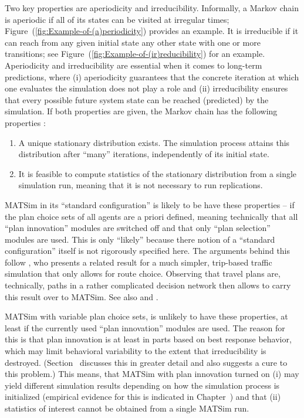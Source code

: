 Two key properties are aperiodicity and irreducibility. Informally,
a Markov chain is aperiodic if all of its states can be visited at
irregular times; Figure~(\ref{fig:Example-of-(a)periodicity}) provides
an example. It is irreducible if it can reach from any given initial
state any other state with one or more transitions; see Figure~(\ref{fig:Example-of-(ir)reducibility})
for an example. Aperiodicity and irreducibility are essential when
it comes to long-term predictions, where (i) aperiodicity guarantees
that the concrete iteration at which one evaluates the simulation
does not play a role and (ii) irreducibility ensures that every possible
future system state can be reached (predicted) by the simulation.
If both properties are given, the Markov chain has the following properties
\citep{ross-2006}:
\begin{enumerate}
\item A unique stationary distribution exists. The simulation process attains
this distribution after {}``many'' iterations, independently of
its initial state.
\item It is feasible to compute statistics of the stationary distribution
from a single simulation run, meaning that it is not necessary to
run replications.
\end{enumerate}
MATSim in its {}``standard configuration'' is likely to be have
these properties -- if the plan choice sets of all agents are a priori
defined, meaning technically that all {}``plan innovation'' modules
are switched off and that only {}``plan selection'' modules are
used. This is only {}``likely'' because there notion of a {}``standard
configuration'' itself is not rigorously specified here. The arguments
behind this follow \citet{cascetta-1989}, who presents a related
result for a much simpler, trip-based traffic simulation that only
allows for route choice. Observing that travel plans are, technically,
paths in a rather complicated decision network then allows to carry
this result over to MATSim. See also \citet{nagel-1998} and \citep{floetteroed-2010e}.

MATSim with variable plan choice sets, is unlikely to have these properties,
at least if the currently used {}``plan innovation'' modules are
used. The reason for this is that plan innovation is at least in parts
based on best response behavior, which may limit behavioral variability
to the extent that irreducibility is destroyed. (Section~
discusses this in greater detail and also suggests a cure to this
problem.) This means, that MATSim with plan innovation turned on (i)
may yield different simulation results depending on how the simulation
process is initialized (empirical evidence for this is indicated in
Chapter~)
and that (ii) statistics of interest cannot be obtained from a single
MATSim run.


